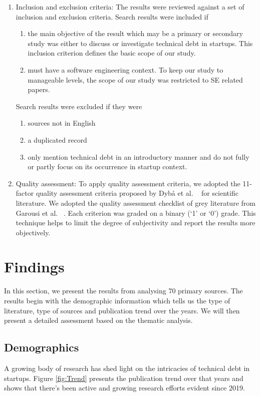 \begin{enumerate}
\item Inclusion and exclusion criteria: The results were reviewed against a set of inclusion and exclusion criteria. Search results were included if 
\begin{enumerate}
\item the main objective of the result which may be a primary or secondary  study was either to discuss or investigate technical debt in startups. This inclusion criterion defines the basic scope of our study.
\item must have a software engineering context. To keep our study to manageable levels, the scope of our study was restricted to SE related papers.
\end{enumerate}
Search results were excluded if they were 
\begin{enumerate}
\item sources not in English
\item a duplicated record 
\item only mention technical debt in an introductory manner and do not fully or partly focus on its occurrence in startup context.
\end{enumerate}
\item Quality assessment: To apply quality assessment criteria, we adopted the 11-factor quality
assessment criteria proposed by Dybå et al. ~\cite{DYBA2008833} for scientific literature. We adopted the quality assessment checklist of grey literature from Garousi et al. ~\cite{GAROUSI2019101}.
Each criterion was graded on a binary (‘1’ or ‘0’) grade. This technique helps to limit the degree of subjectivity and report the results more objectively. 
\end{enumerate}

\section{Findings}\label{Sec:Results}
In this section, we present the results from analysing 70 primary sources. The results begin with the demographic information which tells us the type of literature, type of sources and publication trend over the years. We will then present a detailed assessment based on the thematic analysis.

\subsection{Demographics}
A growing body of research has shed light on the intricacies of technical debt in startups. Figure \ref{fig:Trend} presents the publication trend over that years and shows that there's been active and growing research efforts evident since 2019.


